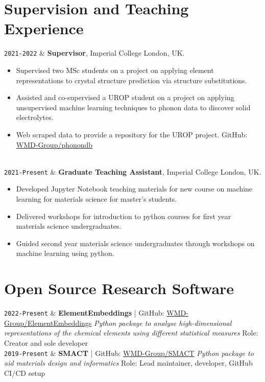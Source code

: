 \documentclass[11pt,a4paper]{article}
\newcommand{\ICL}{Imperial College London}
\newcommand{\Duration}[2]{\fontsize{10pt}{0}\selectfont \texttt{#1-#2}}
\newcommand{\Ongoing}{Present}
\newcommand{\GitHub}[1]{\faGithub{} GitHub: \href{https://github.com/#1}{#1}}
\begin{document}
\section{Supervision and Teaching Experience}

\begin{EntriesTableDuration}
  \Duration{2021}{2022} & \textbf{Supervisor}, \ICL{}, UK.
  \begin{itemize}
    \item Supervised two MSc students on a project on applying element representations to crystal structure prediction via structure substitutions.
    \item Assisted and co-supervised a UROP student on a project on applying unsupervised machine learning techniques to phonon data to discover solid electrolytes. 
    \item Web scraped data to provide a repository for the UROP project. \GitHub{WMD-Group/phonondb} 
    \vspace{-\baselineskip}
  \end{itemize}
  \\
  \Duration{2021}{\Ongoing} & \textbf{Graduate Teaching Assistant}, \ICL{}, UK.
  \begin{itemize}
    \item Developed Jupyter Notebook teaching materials for new course on machine learning for materials science for master's students.
    \item Delivered workshops for introduction to python courses for first year materials science undergraduates.
    \item Guided second year materials science undergraduates through workshops on machine learning using python.
    \vspace{-\baselineskip}
  \end{itemize}
\end{EntriesTableDuration}

\section{Open Source Research Software}

\begin{EntriesTableDuration}
  \Duration{2022}{\Ongoing} &
  \textbf{ElementEmbeddings} | \GitHub{WMD-Group/ElementEmbeddings}
  \newline
  \textit{Python package to analyse high-dimensional representations of the chemical elements using different statistical measures}
  \newline
  Role: Creator and sole developer
  \\
  \Duration{2019}{\Ongoing} &
  \textbf{SMACT} | \GitHub{WMD-Group/SMACT}
  \newline
  \textit{Python package to aid materials design and informatics}
  \newline
  Role: Lead maintainer, developer, GitHub CI/CD setup
\end{EntriesTableDuration}
\end{document}
